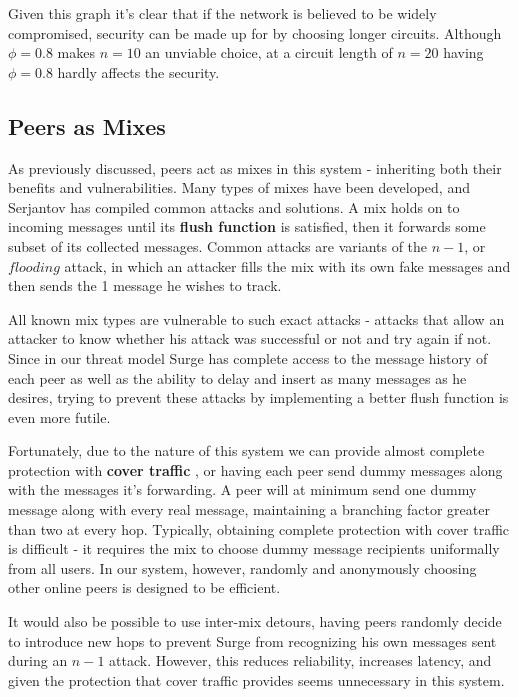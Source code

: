 \documentclass[twocolumn,11pt,english]{article}
\begin{document}
Given this graph it's clear that if the network is believed to be widely compromised, security can be made up for by choosing longer circuits. Although $\phi = 0.8$ makes $n = 10$ an unviable choice, at a circuit length of $n=20$ having $\phi = 0.8$ hardly affects the security. 

\subsection{Peers as Mixes}
As previously discussed, peers act as mixes in this system - inheriting both their benefits and vulnerabilities. Many types of mixes have been developed, and Serjantov \cite{trickle02} has compiled common attacks and solutions. 
A mix holds on to incoming messages until its \textbf{flush function} is satisfied, then it forwards some subset of its collected messages. Common attacks are variants of the $n - 1$, or $flooding$ attack, in which an attacker fills the mix with its own fake messages and then sends the 1 message he wishes to track. 

All known mix types are vulnerable to such exact attacks \cite{trickle02} -  attacks that allow an attacker to know whether his attack was successful or not and try again if not. Since in our threat model Surge has complete access to the message history of each peer as well as the ability to delay and insert as many messages as he desires, trying to prevent these attacks by implementing a better flush function is even more futile. 

Fortunately, due to the nature of this system we can provide almost complete protection with \textbf{cover traffic} \cite{trickle02}, or having each peer send dummy messages along with the messages it's forwarding. A peer will at minimum send one dummy message along with every real message, maintaining a branching factor greater than two at every hop. Typically, obtaining complete protection with cover traffic is difficult - it requires the mix to choose dummy message recipients uniformally from all users\cite{trickle02}. In our system, however, randomly and anonymously choosing other online peers is designed to be efficient.

It would also be possible to use inter-mix detours\cite{trickle02}, having peers randomly decide to introduce new hops to prevent Surge from recognizing his own messages sent during an $n - 1$ attack. However, this reduces reliability, increases latency, and given the protection that cover traffic provides seems unnecessary in this system. 
\end{document}
